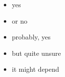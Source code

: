 

\begin{itemize}
    \item yes
    \item or no
    \item probably, yes
    \item but quite unsure
    \item it might depend
\end{itemize}
